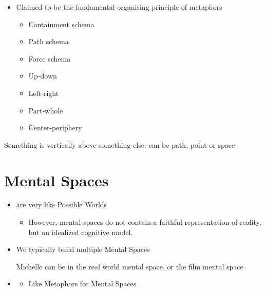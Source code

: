 \documentclass[headrule,footrule]{foils}
\begin{document}
\begin{itemize}
\item Claimed to be the fundamental organising principle of metaphors
  \begin{itemize}
  \item Containment schema
  \item Path schema
  \item Force schema
  \item Up-down
  \item Left-right
  \item Part-whole
  \item Center-periphery
  \end{itemize}
\end{itemize}


\begin{exe}
  \ex {}
  \ex {}
  \ex {}
  \ex {}
  \ex {}
  \ex {}
  \ex {}
  \ex {}
  \ex {}
  \ex {}
  \ex {}
\end{exe}

Something is vertically above something else: can be path, point or space
\section{Mental Spaces}


\begin{itemize}
\item {} are very like Possible Worlds
  \begin{itemize}
  \item However, mental spaces do not contain a faithful
    representation of reality, but an idealized cognitive model.
  \end{itemize}
\item We typically build multiple Mental Spaces
  \begin{exe}
  \ex {}
  \end{exe}
Michelle can be in the real world mental space, or the film mental space
\item {}
  \begin{itemize}
  \item Like Metaphors for Mental Spaces
  \end{itemize}
  \begin{exe}
    \ex {}
  \end{exe}
\end{itemize}
\end{document}
